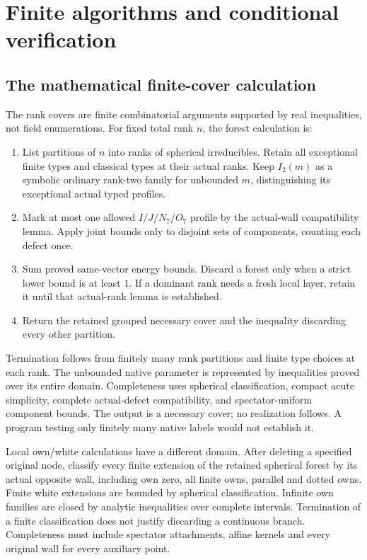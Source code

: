 \documentclass[11pt]{article}
\theoremstyle{definition}
\theoremstyle{remark}
\begin{document}
\section{Finite algorithms and conditional verification}
\label{sec:verification}
\subsection{The mathematical finite-cover calculation}
The rank covers are finite combinatorial arguments supported
by real inequalities, not field enumerations.
For fixed total rank \(n\), the forest calculation is:
\begin{enumerate}
\item List partitions of \(n\) into ranks of spherical irreducibles.
 Retain all exceptional finite types and classical types at
 their actual ranks. Keep \(I_2(m)\) as a symbolic ordinary
 rank-two family for unbounded \(m\), distinguishing its
 exceptional actual typed profiles.
\item Mark at most one allowed \(I/J/N_7/O_7\) profile by the
 actual-wall compatibility lemma. Apply joint bounds only to
 disjoint sets of components, counting each defect once.
\item Sum proved same-vector energy bounds. Discard a forest only
 when a strict lower bound is at least \(1\). If a dominant
 rank needs a fresh local layer, retain it until that
 actual-rank lemma is established.
\item Return the retained grouped necessary cover and the
 inequality discarding every other partition.
\end{enumerate}
Termination follows from finitely many rank partitions and
finite type choices at each rank. The unbounded native
parameter is represented by inequalities proved over its
entire domain. Completeness uses spherical classification,
compact acute simplicity, complete actual-defect compatibility,
and spectator-uniform component bounds. The output is a
necessary cover; no realization follows. A program testing
only finitely many native labels would not establish it.

Local own/white calculations have a different domain.
After deleting a specified original node, classify every
finite extension of the retained spherical forest by its
actual opposite wall, including own zero, all finite owns,
parallel and dotted owns. Finite white extensions are bounded
by spherical classification. Infinite own families are closed
by analytic inequalities over complete intervals.
Termination of a finite classification does not justify
discarding a continuous branch. Completeness must include
spectator attachments, affine kernels and every original
wall for every auxiliary point.
\end{document}
